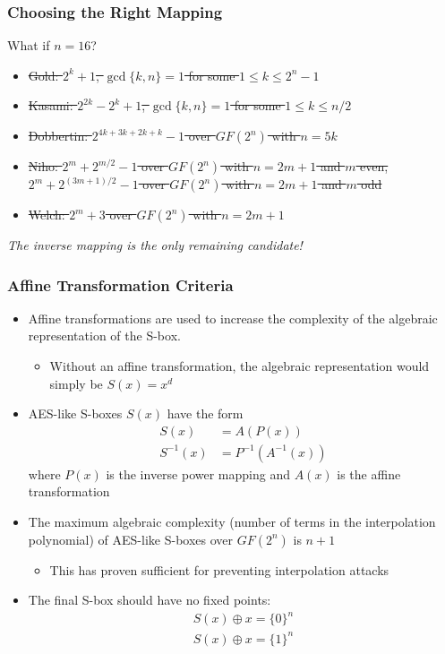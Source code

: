 \documentclass[handout,10pt]{beamer}
\begin{document}
\begin{frame}
	\frametitle{Choosing the Right Mapping}
	What if $n = 16$?
	\begin{itemize}
		\item \sout{Gold: $2^{k} + 1$, $\gcd\{k,n\} = 1$ for some $1 \leq k \leq 2^{n} - 1$}
		\pause
		\item \sout{Kasami: $2^{2k} - 2^k + 1$, $\gcd\{k,n\} = 1$ for some $1 \leq k \leq n/2$}
		\pause
		\item \sout{Dobbertin: $2^{4k + 3k + 2k + k} - 1$ over $GF(2^n)$ with $n = 5k$}
		\pause
		\item \sout{Niho: $2^{m} + 2^{m/2} - 1$ over $GF(2^n)$ with $n = 2m + 1$ and $m$ even, $2^{m} + 2^{(3m + 1)/2} - 1$ over $GF(2^n)$ with $n = 2m + 1$ and $m$ odd}
		\pause
		\item \sout{Welch: $2^m + 3$ over $GF(2^n)$ with $n = 2m + 1$}
	\end{itemize}
	\pause
	\begin{center}
		\emph{The inverse mapping is the only remaining candidate!}
	\end{center}
\end{frame}

\begin{frame}
	\frametitle{Affine Transformation Criteria}
	\begin{itemize}
		\item Affine transformations are used to increase the complexity of the algebraic representation of the S-box.
		\begin{itemize}
			\item Without an affine transformation, the algebraic representation would simply be $S(x) = x^d$
		\end{itemize}
		\pause
		\item AES-like S-boxes $S(x)$ have the form
		\begin{align*}
			S(x) & = A(P(x)) \\
			S^{-1}(x) & = P^{-1}(A^{-1}(x))
		\end{align*}
		where $P(x)$ is the inverse power mapping and $A(x)$ is the affine transformation
		\pause
		\item The maximum algebraic complexity (number of terms in the interpolation polynomial) of AES-like S-boxes over $GF(2^n)$ is $n + 1$
		\begin{itemize}
			\item This has proven sufficient for preventing interpolation attacks
		\end{itemize}
		\pause
		\item The final S-box should have no fixed points:
		\begin{align*}
			S(x) \oplus x = \{0\}^n \\
			S(x) \oplus x = \{1\}^n
		\end{align*}
	\end{itemize}
\end{frame}
\end{document}
